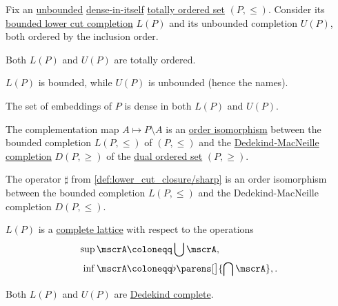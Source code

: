 \begin{theorem}\label{thm:unbounded_lower_cut_completion}
  Fix an \hyperref[def:extremal_points/bounds]{unbounded} \hyperref[def:dense_total_order]{dense-in-itself} \hyperref[def:totally_ordered_set]{totally ordered set} \( (P, \leq) \). Consider its \hyperref[def:lower_cut_completion]{bounded lower cut completion} \( L(P) \) and its unbounded completion \( U(P) \), both ordered by the inclusion order.

  \begin{thmenum}
     Both \( L(P) \) and \( U(P) \) are totally ordered.

     \( L(P) \) is bounded, while \( U(P) \) is unbounded (hence the names).

     The set of embeddings of \( P \) is dense in both \( L(P) \) and \( U(P) \).

     The complementation map \( A \mapsto P \setminus A \) is an \hyperref[def:partially_ordered_set/morphism]{order isomorphism} between the bounded completion \( L(P, \leq) \) of \( (P, \leq) \) and the \hyperref[def:dedekind_macnielle_completion]{Dedekind-MacNeille completion} \( D(P, \geq) \) of the \hyperref[def:partially_ordered_set/opposite]{dual ordered set} \( (P, \geq) \).

     The operator \( \sharp \) from \cref{def:lower_cut_closure/sharp} is an order isomorphism between the bounded completion \( L(P, \leq) \) and the Dedekind-MacNeille completion \( D(P, \leq) \).

     \( L(P) \) is a \hyperref[def:complete_lattice]{complete lattice} with respect to the operations
    \begin{align}
      \sup \mscrA &\coloneqq \bigcup \mscrA,                       \label{eq:thm:unbounded_lower_cut_completion/lattice/join} \\
      \inf \mscrA &\coloneqq \flat\parens[\big]{ \bigcap \mscrA }, \label{eq:thm:unbounded_lower_cut_completion/lattice/meet}.
    \end{align}

     Both \( L(P) \) and \( U(P) \) are \hyperref[def:dedekind_completeness]{Dedekind complete}.
  \end{thmenum}
\end{theorem}
